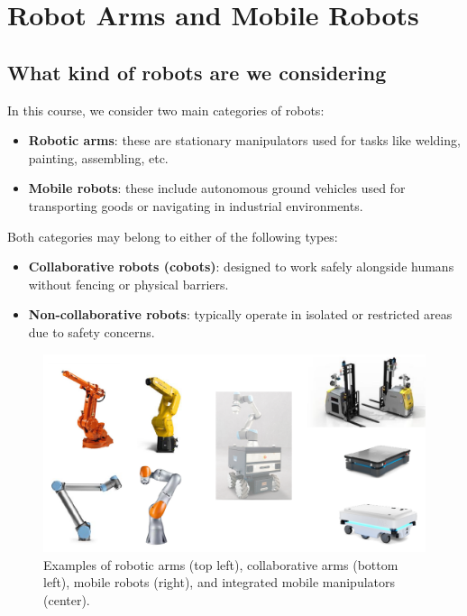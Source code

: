 \section{Robot Arms and Mobile Robots}

\subsection{What kind of robots are we considering}

In this course, we consider two main categories of robots:
\begin{itemize}
  \item \textbf{Robotic arms}: these are stationary manipulators used for tasks like welding, painting, assembling, etc.
  \item \textbf{Mobile robots}: these include autonomous ground vehicles used for transporting goods or navigating in industrial environments.
\end{itemize}

Both categories may belong to either of the following types:
\begin{itemize}
  \item \textbf{Collaborative robots (cobots)}: designed to work safely alongside humans without fencing or physical barriers.
  \item \textbf{Non-collaborative robots}: typically operate in isolated or restricted areas due to safety concerns.
\end{itemize}

\begin{figure}[H]
  \centering
  \includegraphics[width=\linewidth]{imgs/robot_types.png}
  \caption{Examples of robotic arms (top left), collaborative arms (bottom left), mobile robots (right), and integrated mobile manipulators (center).}
\end{figure}


